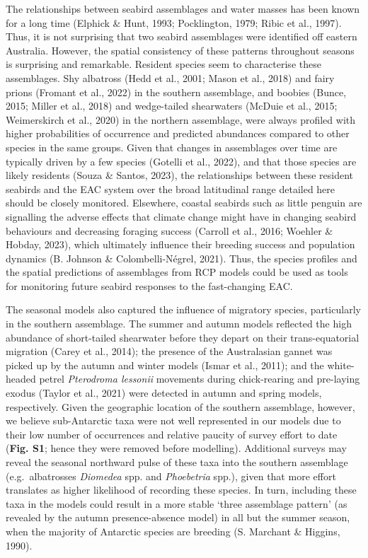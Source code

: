 \documentclass{article}
\begin{document}
The relationships between seabird assemblages and water masses has been
known for a long time (Elphick \& Hunt, 1993; Pocklington, 1979; Ribic
et al., 1997). Thus, it is not surprising that two seabird assemblages
were identified off eastern Australia. However, the spatial consistency
of these patterns throughout seasons is surprising and remarkable.
Resident species seem to characterise these assemblages. Shy albatross
(Hedd et al., 2001; Mason et al., 2018) and fairy prions (Fromant et
al., 2022) in the southern assemblage, and boobies (Bunce, 2015; Miller
et al., 2018) and wedge-tailed shearwaters (McDuie et al., 2015;
Weimerskirch et al., 2020) in the northern assemblage, were always
profiled with higher probabilities of occurrence and predicted
abundances compared to other species in the same groups. Given that
changes in assemblages over time are typically driven by a few species
(Gotelli et al., 2022), and that those species are likely residents
(Souza \& Santos, 2023), the relationships between these resident
seabirds and the EAC system over the broad latitudinal range detailed
here should be closely monitored. Elsewhere, coastal seabirds such as
little penguin are signalling the adverse effects that climate change
might have in changing seabird behaviours and decreasing foraging
success (Carroll et al., 2016; Woehler \& Hobday, 2023), which
ultimately influence their breeding success and population dynamics (B.
Johnson \& Colombelli-Négrel, 2021). Thus, the species profiles and the
spatial predictions of assemblages from RCP models could be used as
tools for monitoring future seabird responses to the fast-changing EAC.

The seasonal models also captured the influence of migratory species,
particularly in the southern assemblage. The summer and autumn models
reflected the high abundance of short-tailed shearwater before they
depart on their trans-equatorial migration (Carey et al., 2014); the
presence of the Australasian gannet was picked up by the autumn and
winter models (Ismar et al., 2011); and the white-headed petrel
\emph{Pterodroma lessonii} movements during chick-rearing and pre-laying
exodus (Taylor et al., 2021) were detected in autumn and spring models,
respectively. Given the geographic location of the southern assemblage,
however, we believe sub-Antarctic taxa were not well represented in our
models due to their low number of occurrences and relative paucity of
survey effort to date (\textbf{Fig. S1}; hence they were removed before
modelling). Additional surveys may reveal the seasonal northward pulse
of these taxa into the southern assemblage (e.g.~albatrosses
\emph{Diomedea} spp. and \emph{Phoebetria} spp.), given that more effort
translates as higher likelihood of recording these species. In turn,
including these taxa in the models could result in a more stable `three
assemblage pattern' (as revealed by the autumn presence-absence model)
in all but the summer season, when the majority of Antarctic species are
breeding (S. Marchant \& Higgins, 1990).
\end{document}
